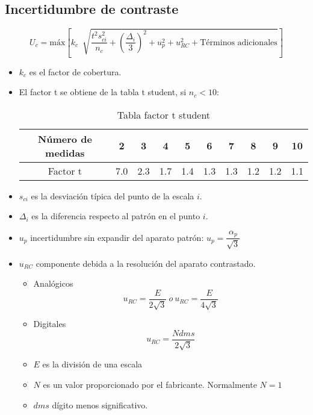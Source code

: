 \subsection{Incertidumbre de contraste}
\[U_c = \text{máx} \left[{k_c \ \sqrt[]{\frac{t^2 s_{ci}^2}{n_c}+\left({\frac{\Delta_i}{3}}\right)^2+u_p^2+u_{RC}^2+\text{Términos adicionales}}}\right]\]

\begin{itemize}
\item $k_c$ es el factor de cobertura.

	\item El factor t se obtiene de la tabla t student, si $n_c < 10$:
\renewcommand{\arraystretch}{1.1} %
\begin{table}[H]
	\centering
	\begin{tabular}{|c|c|c|c|c|c|c|c|c|c|}
		\hline
		\textbf{Número de medidas} & \textbf{2} & \textbf{3} & \textbf{4} & \textbf{5} & \textbf{6} & \textbf{7}
		& \textbf{8} & \textbf{9} & \textbf{10} \\
		\hline
		Factor t& 7.0 & 2.3 & 1.7 & 1.4 & 1.3 & 1.3 & 1.2
		& 1.2 & 1.1  \\
		\hline 
	\end{tabular}
	\caption{Tabla factor t student}
	\label{tab:example}
\end{table}

\item $s_{ci}$ es la desviación típica del punto de la escala $i$.
\item $\Delta_i$ es la diferencia respecto al patrón en el punto $i$.
\item $u_p$ incertidumbre sin expandir del aparato patrón:  $u_p=\dfrac{\alpha_p}{\sqrt{3}}$

\item $u_{RC}$ componente debida a la resolución del aparato contrastado.
\begin{itemize}
	\item Analógicos
	\[u_{RC}=\frac{E}{2\sqrt{3}} \ o \ u_{RC}=\frac{E}{4\sqrt{3}}\]
	
	\item Digitales
	\[u_{RC}=\frac{N dms}{2\sqrt{3}}\]
	
	\item $E$ es la división de una escala
	\item $N$ es un valor proporcionado por el fabricante. Normalmente $N = 1$
	\item $dms$ dígito menos significativo. 
\end{itemize}
\end{itemize}



